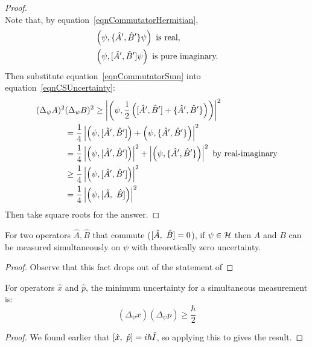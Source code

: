 \documentclass[../Main.tex]{subfiles}
\begin{document}
\begin{proof}
\begin{equation}
        \label{eqnCommutatorSum}
    \end{equation}
    Note that, by equation~\ref{eqnCommutatorHermitian},
    \begin{align*}
        &\left(\psi,\{\hat{A}', \hat{B}'\}\psi\right) \text{ is real,} \\
        &\left(\psi,[\hat{A}', \hat{B}']\psi\right) \text{ is pure imaginary.} \\
    \end{align*}
    Then substitute equation~\ref{eqnCommutatorSum} into equation~\ref{eqnCSUncertainty}:
    \begin{align*}
        (\Delta_\psi A)^2& (\Delta_\psi B)^2\geq \left|\left(\psi,\frac12 \left([\hat{A}', \hat{B}'] + \{\hat{A}', \hat{B}'\}\right)\right)\right|^2 \\
        &= \frac14 \left|\left(\psi,[\hat{A}', \hat{B}']\right) + \left(\psi,\{\hat{A}', \hat{B}'\}\right)\right|^2 \\
        &= \frac14 \left|\left(\psi,[\hat{A}', \hat{B}']\right)\right|^2 + \left|\left(\psi,\{\hat{A}', \hat{B}'\}\right)\right|^2 \text{ by real-imaginary} \\
        &\geq \frac14 \left|\left(\psi,[\hat{A}', \hat{B}']\right)\right|^2 \\
        &= \frac14 \left|\left(\psi,[\hat{A},~\hat{B}]\right)\right|^2 \\
    \end{align*}
    Then take square roots for the answer.
\end{proof}
\begin{corollary}
    For two operators $\hat{A}, \hat{B}$ that commute ($[\hat{A},~\hat{B}] = 0$), if $\psi \in \mathcal{H}$ then $A$ and $B$ can be measured simultaneously on $\psi$ with theoretically zero uncertainty.
    \label{corCommuteImpliesSimultaneous}
\end{corollary}
\begin{proof}
    Observe that this fact drops out of the statement of 
\end{proof}
\begin{corollary}
    For operators $\hat{x}$ and $\hat{p}$, the minimum uncertainty for a simultaneous measurement is:
    \begin{equation*}
        (\Delta_\psi x) (\Delta_\psi p) \geq \frac\hbar2
    \end{equation*}
    \label{corHeisenbergUncertainty}
\end{corollary}
\begin{proof}
    We found earlier that $[\hat{x},~\hat{p}] = i \hbar \hat{I}$, so applying this to  gives the result.
\end{proof}
\end{document}

